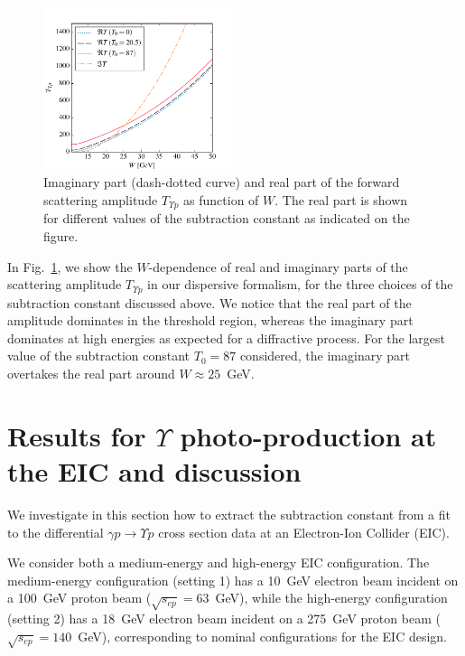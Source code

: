 \documentclass[prd,amsmath,twocolumn,floatfix,amssymb, preprintnumbers, linenumbers,nofootinbib, superscriptaddress]{revtex4}
\begin{document}
\begin{figure}
\includegraphics[width=0.49\textwidth]{t_y.pdf}
\caption{
Imaginary part (dash-dotted curve) and real part of the forward scattering amplitude $T_{\Upsilon p}$ as function of $W$.
The real part is shown for different values of the subtraction constant as indicated on the figure.
}
\label{fig:psip_psip}
\end{figure}


In Fig.~\ref{fig:psip_psip}, we show the $W$-dependence of real and imaginary parts of the scattering amplitude $T_{\Upsilon p}$ in our dispersive formalism, for the three choices of the subtraction constant discussed above. We notice that the real part of the amplitude dominates in the threshold region, whereas the imaginary part dominates at high energies as expected for a diffractive process. For the largest value of the subtraction constant $T_0 = 87$ considered, the imaginary part overtakes the real part around $W \approx 25$~GeV.  




\section{Results for $\Upsilon$ photo-production at the EIC and discussion}

We investigate in this section how to extract the subtraction constant from a fit to the 
 differential $\gamma p \to \Upsilon p$ cross section data at an Electron-Ion Collider (EIC). 
 
We consider both a medium-energy and high-energy EIC configuration. 
The medium-energy configuration (setting 1) has a 10~GeV electron beam incident on a 100~GeV proton beam 
($\sqrt{s_{ep}} = 63$~GeV), while the high-energy configuration (setting 2) has a 18~GeV electron beam incident 
on a 275~GeV proton beam ($\sqrt{s_{ep}} = 140$~GeV), 
corresponding to nominal configurations for the EIC design.
\end{document}
